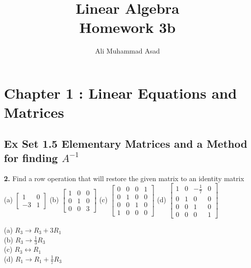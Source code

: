 \documentclass[addpoints]{exam}
\title{Linear Algebra\\ Homework 3b}
\author{Ali Muhammad Asad}
\begin{document}
\maketitle
\section*{\textbf{Chapter 1 : Linear Equations and Matrices}}
\subsection*{\textbf{Ex Set 1.5 Elementary Matrices and a Method for finding $ A^{-1} $}}
\begin{questions}
    \question
    \textbf{2. } Find a row operation that will restore the given matrix to an identity matrix \\
    (a) $ \begin{bmatrix}
        1 & 0 \\ -3 & 1
    \end{bmatrix} $ \hspace{5mm} (b) $ \begin{bmatrix}
        1 & 0 & 0 \\ 0 & 1 & 0 \\ 0 & 0 & 3
    \end{bmatrix} $ \hspace{5mm} (c) $ \begin{bmatrix}
        0 & 0 & 0 & 1 \\ 0 & 1 & 0 & 0 \\ 0 & 0 & 1 & 0 \\ 1 & 0 & 0 & 0
    \end{bmatrix} $ \hspace{5mm} (d) $ \begin{bmatrix}
        1 & 0 & -\frac{1}{7} & 0 \\ 0 & 1 & 0 & 0 \\ 0 & 0 & 1 & 0 \\ 0 & 0 & 0 & 1
    \end{bmatrix} $ 
    \begin{solution}
        
        (a) $ R_3 \longrightarrow R_3 + 3R_1 $ \\ 
        (b) $ R_3 \longrightarrow \frac{1}{3} R_3 $ \\ 
        (c) $ R_3 \longleftrightarrow R_1 $ \\
        (d) $ R_1 \longrightarrow R_1 + \frac{1}{7}R_3 $


\end{solution}
\end{questions}
\end{document}
